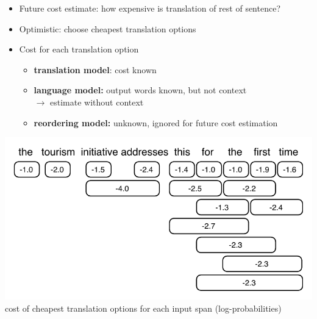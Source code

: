 \documentclass[landscape]{slides}
\begin{document}
\begin{itemize}\vspace{10mm}
\item Future cost estimate: how expensive is translation of rest of sentence?
\item Optimistic: choose cheapest translation options
\item Cost for each translation option
\begin{itemize}
\item {\bf translation model}: cost known \vspace{4mm}
\item {\bf language model:} output words known, but not context\\ $\rightarrow$ estimate without context\vspace{4mm}
\item {\bf reordering model:} unknown, ignored for future cost estimation
\end{itemize}
\end{itemize}


\begin{center}
\includegraphics[scale=1.7]{future-cost-covered-spans.pdf}\\[8mm]
cost of cheapest translation options for each input span (log-probabilities)
\end{center}


\end{document}
